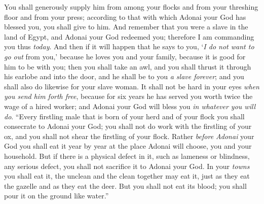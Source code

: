 \begin{biblechapter}
\verse You shall generously supply him from among your flocks and from your threshing floor and from your press; according to that with which Adonai your God has blessed you, you shall give to him.
\verse And remember that you were a slave in the land of Egypt, and Adonai your God redeemed you; therefore I am commanding you thus \textit{today}.
\verse And then if it will happen that he says to you, ‘\textit{I do not want to go out} from you,’ because he loves you and your family, because it is good for him to be with you;
\verse then you shall take an awl, and you shall thrust it through his earlobe and into the door, and he shall be to you \textit{a slave forever}; and you shall also do likewise for your slave woman.
\verse It shall not be hard in your eyes \textit{when you send him forth free}, because for six years he has served you worth twice the wage of a hired worker; and Adonai your God will bless you \textit{in whatever you will do}.
\verse “Every firstling male that is born of your herd and of your flock you shall consecrate to Adonai your God; you shall not do work with the firstling of your ox, and you shall not shear the firstling of your flock.
\verse Rather \textit{before Adonai} your God you shall eat it year by year at the place Adonai will choose, you and your household.
\verse But if there is a physical defect in it, such as lameness or blindness, any serious defect, you shall not sacrifice it to Adonai your God.
\verse In your \textit{towns} you shall eat it, the unclean and the clean together may eat it, just as they eat the gazelle and as they eat the deer.
\verse But you shall not eat its blood; you shall pour it on the ground like water.”
\end{biblechapter}

